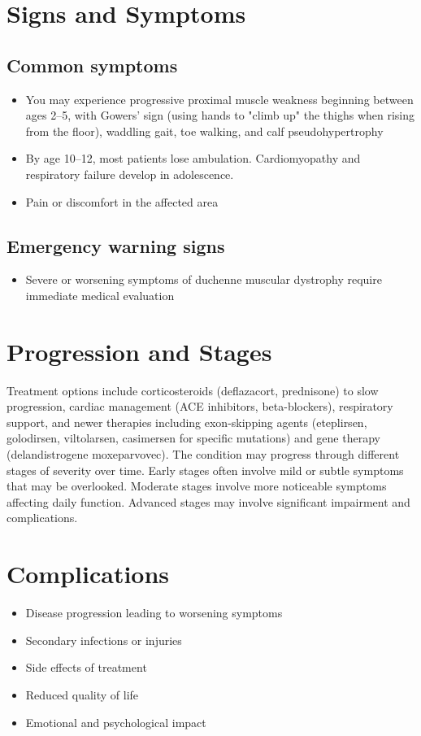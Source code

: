 \section{Signs and Symptoms}

\subsection{Common symptoms}
\begin{itemize}[noitemsep]
  \item You may experience progressive proximal muscle weakness beginning between ages 2--5, with Gowers' sign (using hands to "climb up" the thighs when rising from the floor), waddling gait, toe walking, and calf pseudohypertrophy
  \item By age 10--12, most patients lose ambulation. Cardiomyopathy and respiratory failure develop in adolescence.
  \item Pain or discomfort in the affected area
  \end{itemize}

\subsection{Emergency warning signs}
\begin{itemize}[noitemsep]
  \item Severe or worsening symptoms of duchenne muscular dystrophy require immediate medical evaluation
\end{itemize}
\section{Progression and Stages}
Treatment options include corticosteroids (deflazacort, prednisone) to slow progression, cardiac management (ACE inhibitors, beta-blockers), respiratory support, and newer therapies including exon-skipping agents (eteplirsen, golodirsen, viltolarsen, casimersen for specific mutations) and gene therapy (delandistrogene moxeparvovec). The condition may progress through different stages of severity over time. Early stages often involve mild or subtle symptoms that may be overlooked. Moderate stages involve more noticeable symptoms affecting daily function. Advanced stages may involve significant impairment and complications.
\section{Complications}
\begin{itemize}[noitemsep]
  \item Disease progression leading to worsening symptoms
  \item Secondary infections or injuries
  \item Side effects of treatment
  \item Reduced quality of life
  \item Emotional and psychological impact
\end{itemize}

